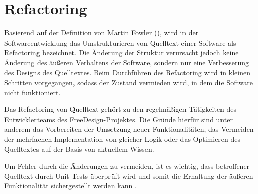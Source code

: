\section{Refactoring}

Basierend auf der Definition von Martin Fowler (\citeyear[vgl.][S. 79-80]{Fowler2020}), wird in der Softwareentwicklung das Umstrukturieren von Quelltext einer Software als Refactoring bezeichnet. Die Änderung der Struktur verursacht jedoch keine Änderung des äußeren Verhaltens der Software, sondern nur eine Verbesserung des Designs des Quelltextes.
Beim Durchführen des Refactoring wird in kleinen Schritten vorgegangen, sodass der Zustand vermieden wird, in dem die Software nicht funktioniert.  

Das Refactoring von Quelltext gehört zu den regelmäßigen Tätigkeiten des Entwicklerteams des FreeDesign-Projektes. Die Gründe hierfür sind unter anderem das Vorbereiten der Umsetzung neuer Funktionalitäten, das Vermeiden der mehrfachen Implementation von gleicher Logik oder das Optimieren des Quelltextes auf der Basis von aktuellem Wissen.

Um Fehler durch die Änderungen zu vermeiden, ist es wichtig, dass betroffener Quelltext durch Unit-Tests überprüft wird und somit die Erhaltung der äußeren Funktionalität sichergestellt werden kann \autocite[vgl.][211]{ThomasAndHunt2020}. 
